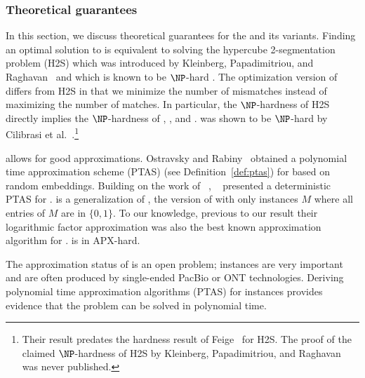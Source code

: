 \subsubsection{Theoretical guarantees}
In this section, we discuss theoretical guarantees for the \MEC and its variants.
Finding an optimal solution to \BMEC is equivalent to solving the hypercube 2-segmentation problem (H2S) 
which was introduced by Kleinberg, Papadimitriou, and Raghavan~\citep{KPR98_segmentation,KPR04_segmentation} and which is known to be $\NP$-hard \citep{Fei14_np,KPR04_segmentation}.
The optimization version of \BMEC  differs from H2S in that we minimize the number of mismatches instead of maximizing the number of matches.
In particular, the $\NP$-hardness of H2S directly implies the $\NP$-hardness of \BMEC, \GMEC, and \MEC.
\GMEC was shown to be $\NP$-hard by Cilibrasi et al.~\citep{Cilibrasi2007}.\footnote{Their result predates the hardness result of Feige~\citep{Fei14_np} for H2S. The proof of the claimed $\NP$-hardness of H2S by Kleinberg, Papadimitriou, and Raghavan~\citep{KPR98_segmentation} was never published.}


\BMEC allows for good approximations.
Ostravsky and Rabiny~\citep{OR02_polynomial} obtained a polynomial time approximation scheme (PTAS) (see Definition~\ref{def:ptas}) for \BMEC based on random embeddings.
Building on the work of ~\cite{LMW02_finding}, ~\cite{JXL04_k} presented a deterministic PTAS for \BMEC.
\GMEC is a generalization of \BMEC, the version of \MEC with only instances $M$ where all entries of $M$ are in $\{0,1\}$.
To our knowledge, previous to our result their logarithmic factor approximation was also the best known approximation algorithm for \GMEC.
\MEC is in APX-hard.


\begin{gaps}
 The approximation status of \GMEC is an open problem; \GMEC instances are very important and are often produced by single-ended PacBio or ONT technologies.
 Deriving polynomial time approximation algorithms (PTAS) for \GMEC instances provides evidence that the problem can be solved in polynomial time.
 \label{gap:gap1}
\end{gaps}

